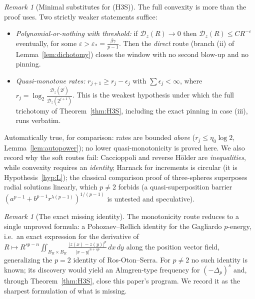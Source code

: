 \documentclass[11pt]{amsart}
\theoremstyle{plain}
\theoremstyle{definition}
\theoremstyle{remark}
\newtheorem{remark}[theorem]{Remark}
\begin{document}
\begin{remark}[Minimal substitutes for \textnormal{(H3S)}]
\label{rem:substitutes}
The full convexity is more than the proof uses. Two strictly weaker
statements suffice:
\begin{itemize}[leftmargin=2em]
\item[\textnormal{(S1)}] \emph{Polynomial-or-nothing with threshold:} if
$\mathcal D_z(R)\to0$ then $\mathcal D_z(R)\le CR^{-\varepsilon}$
eventually, for some $\varepsilon>\varepsilon_*=\frac{\beta\gamma}{p-1}$.
Then the \emph{direct} route \textnormal{(}branch (ii) of
Lemma~\ref{lem:dichotomy}\textnormal{)} closes the window with no second
blow-up and no pinning.
\item[\textnormal{(S2)}] \emph{Quasi-monotone rates:}
$r_{j+1}\ge r_j-\epsilon_j$ with $\sum\epsilon_j<\infty$, where
$r_j=\log_2\frac{\mathcal D_z(2^j)}{\mathcal D_z(2^{j+1})}$. This is the
weakest hypothesis under which the full trichotomy of
Theorem~\ref{thm:H3S}, including the exact pinning in case (iii), runs
verbatim.
\end{itemize}
Automatically true, for comparison: rates are bounded \emph{above}
($r_j\le\eta_0\log2$, Lemma~\ref{lem:autopower}); no lower
quasi-monotonicity is proved here. We also record why the soft routes
fail: Caccioppoli and reverse H\"older are \emph{inequalities}, while
convexity requires an \emph{identity}; Harnack for increments is circular
\textnormal{(}it is Hypothesis~\ref{hyp:L}\textnormal{)}; the classical
comparison proof of three-spheres superposes radial solutions linearly,
which $p\neq2$ forbids \textnormal{(}a quasi-superposition barrier
$(a^{p-1}+b^{p-1}r^{\lambda(p-1)})^{1/(p-1)}$ is untested and
speculative\textnormal{)}.
\end{remark}

\begin{remark}[The exact missing identity]\label{rem:pohozaev}
The monotonicity route reduces to a single unproved formula: a
Pohozaev--Rellich identity for the Gagliardo $p$-energy, i.e.\ an exact
expression for the derivative of
$R\mapsto R^{sp-n}\iint_{B_R\times B_R}
\frac{|z(x)-z(y)|^p}{|x-y|^{n+sp}}\,dx\,dy$
along the position vector field, generalizing the $p=2$ identity of
Ros-Oton--Serra. For $p\neq2$ no such identity is known; its discovery
would yield an Almgren-type frequency for $(-\Delta_p)^s$ and, through
Theorem~\ref{thm:H3S}, close this paper's program. We record it as the
sharpest formulation of what is missing.
\end{remark}
\end{document}
